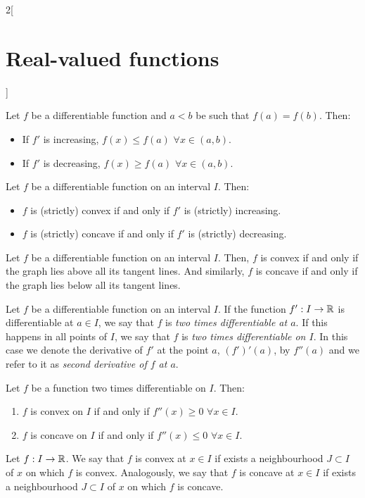 \documentclass[../../../main.tex]{subfiles}
\begin{document}
\begin{multicols}{2}[\section{Real-valued functions}]
\begin{lemma}
    Let $f$ be a differentiable function and $a<b$ be such that $f(a)=f(b)$. Then:
    \begin{itemize}
      \item If $f'$ is increasing, $f(x)\leq f(a)$ $\forall x\in(a,b)$.
      \item If $f'$ is decreasing, $f(x)\geq f(a)$ $\forall x\in(a,b)$.
    \end{itemize}
  \end{lemma}
  \begin{theorem}
    Let $f$ be a differentiable function on an interval $I$. Then:
    \begin{itemize}
      \item $f$ is (strictly) convex if and only if $f'$ is (strictly) increasing.
      \item $f$ is (strictly) concave if and only if $f'$ is (strictly) decreasing.
    \end{itemize}
  \end{theorem}
  \begin{theorem}
    Let $f$ be a differentiable function on an interval $I$. Then, $f$ is convex if and only if the graph lies above all its tangent lines. And similarly, $f$ is concave if and only if the graph lies below all its tangent lines.
  \end{theorem}
  \begin{definition}\label{RVF-second_derivative}
    Let $f$ be a differentiable function on an interval $I$. If the function $f':I\rightarrow\mathbb{R}$ is differentiable at $a\in I$, we say that $f$ is \textit{two times differentiable at $a$}. If this happens in all points of $I$, we say that $f$ is \textit{two times differentiable on $I$}. In this case we denote the derivative of $f'$ at the point $a$, $(f')'(a)$, by $f''(a)$ and we refer to it as \textit{second derivative of $f$ at $a$}.
  \end{definition}
  \begin{theorem}
    Let $f$ be a function two times differentiable on $I$. Then:
    \begin{enumerate}
      \item $f$ is convex on $I$ if and only if $f''(x)\geq 0$ $\forall x\in I$.
      \item $f$ is concave on $I$ if and only if $f''(x)\leq 0$ $\forall x\in I$.
    \end{enumerate}
  \end{theorem}
  \begin{definition}
    Let $f:I\rightarrow\mathbb{R}$. We say that $f$ is convex at $x\in I$ if exists a neighbourhood $J\subset I$ of $x$ on which $f$ is convex. Analogously, we say that $f$ is concave at $x\in I$ if exists a neighbourhood $J\subset I$ of $x$ on which $f$ is concave.

\end{definition}
\end{multicols}
\end{document}
